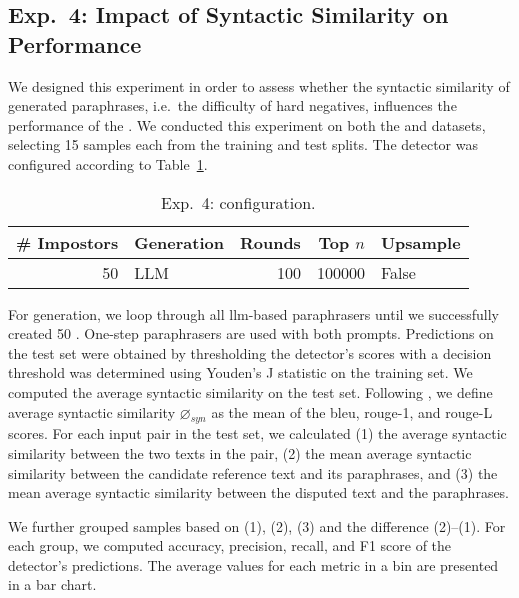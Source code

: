 \subsection{Exp.\ 4: Impact of Syntactic Similarity on \impApprTitle{} Performance}
\label{sec:syn_sim_impact_}

We designed this experiment in order to assess whether the syntactic similarity of generated paraphrases, i.e.\ the difficulty of hard negatives, influences the performance of the \impAppr{}.
We conducted this experiment on both the \dataBlog{} and \dataStudent{} datasets, selecting 15 samples each from the training and test splits. 
The detector was configured according to Table~\ref{tab:imp_syn_sim_config}.

\begin{table}[h]
\centering\small
\caption{Exp.\ 4: \impAppr{} configuration.}
\label{tab:imp_syn_sim_config}
\begin{tabular}{@{}rlrrl@{}}   %
\toprule
\# Impostors & Generation & Rounds & Top $n$ & Upsample \\
\midrule
50 & LLM & 100 & \num{100000} & False \\
\bottomrule
\end{tabular}%
\end{table}

For generation, we loop through all \ac{llm}-based paraphrasers until we successfully created 50 \imps{}.
One-step paraphrasers are used with both prompts.
Predictions on the test set were obtained by thresholding the detector’s scores with a decision threshold was determined using Youden’s J statistic on the training set.
We computed the average syntactic similarity on the test set. 
Following \citet{gohsen_captions_2023}, we define average syntactic similarity $\diameter_{syn}$ as the mean of the \ac{bleu}, \ac{rouge}-1, and \ac{rouge}-L scores. 
For each input pair in the test set, we calculated
(1) the average syntactic similarity between the two texts in the pair, (2) the mean average syntactic similarity between the candidate reference text and its paraphrases, and (3) the mean average syntactic similarity between the disputed text and the paraphrases.

We further grouped samples based on (1), (2), (3) and the difference (2)–(1). 
For each group, we computed accuracy, precision, recall, and F1 score of the detector’s predictions. 
The average values for each metric in a bin are presented in a bar chart.

